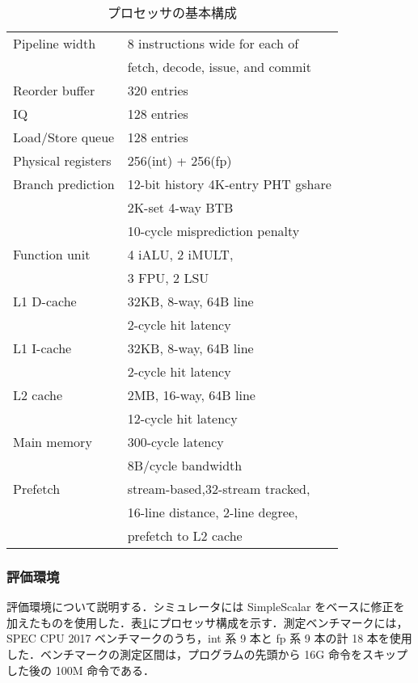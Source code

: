 \documentclass[twocolumn]{jsarticle}
\begin{document}
  \begin{table}[htb]
    \caption{プロセッサの基本構成}
    \footnotesize
    \center
      \begin{tabular}{l|l} \hline \hline
       Pipeline width & 8 instructions wide for each of \\
       & fetch, decode, issue, and commit \\
       Reorder buffer & 320 entries \\
       IQ & 128 entries \\
       Load/Store queue & 128 entries \\
       Physical registers & 256(int) + 256(fp) \\
       Branch prediction & 12-bit history 4K-entry PHT gshare \\
       & 2K-set 4-way BTB \\
       & 10-cycle misprediction penalty \\
       Function unit & 4 iALU, 2 iMULT, \\
       &  3 FPU, 2 LSU \\
       L1 D-cache & 32KB, 8-way, 64B line \\
        & 2-cycle hit latency \\
       L1 I-cache & 32KB, 8-way, 64B line \\
        &  2-cycle hit latency \\
       L2 cache & 2MB, 16-way, 64B line \\
        & 12-cycle hit latency \\  
       Main memory & 300-cycle latency \\
       & 8B/cycle bandwidth \\ 
       Prefetch & stream-based,32-stream tracked,  \\ 
       & 16-line distance, 2-line degree, \\
       & prefetch to L2 cache \\ \hline
    \end{tabular}
    \label{tab:base_config}
  \end{table}

  \subsubsection{評価環境}
  \label{sec:config}
  評価環境について説明する．シミュレータには SimpleScalar をベースに修正を加えたものを使用した．表\ref{tab:base_config}にプロセッサ構成を示す．測定ベンチマークには，SPEC CPU 2017 ベンチマークのうち，int 系 9 本と fp 系 9 本の計 18 本を使用した．ベンチマークの測定区間は，プログラムの先頭から 16G 命令をスキップした後の 100M 命令である．
\end{document}
